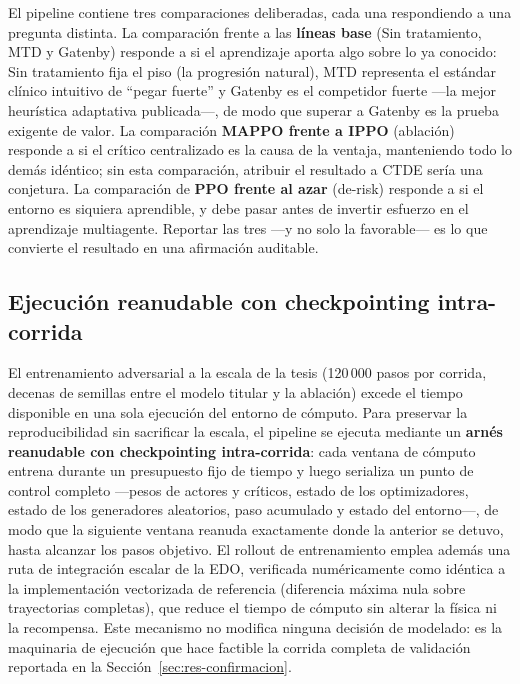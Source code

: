 El pipeline contiene tres comparaciones deliberadas, cada una respondiendo a una pregunta distinta. La comparación frente a las \textbf{líneas base} (Sin tratamiento, MTD y Gatenby) responde a si el aprendizaje aporta algo sobre lo ya conocido: Sin tratamiento fija el piso (la progresión natural), MTD representa el estándar clínico intuitivo de ``pegar fuerte'' y Gatenby es el competidor fuerte ---la mejor heurística adaptativa publicada---, de modo que superar a Gatenby es la prueba exigente de valor. La comparación \textbf{MAPPO frente a IPPO} (ablación) responde a si el crítico centralizado es la causa de la ventaja, manteniendo todo lo demás idéntico; sin esta comparación, atribuir el resultado a CTDE sería una conjetura. La comparación de \textbf{PPO frente al azar} (de-risk) responde a si el entorno es siquiera aprendible, y debe pasar antes de invertir esfuerzo en el aprendizaje multiagente. Reportar las tres ---y no solo la favorable--- es lo que convierte el resultado en una afirmación auditable.

\subsection{Ejecución reanudable con checkpointing intra-corrida}
\label{sec:checkpointing}

El entrenamiento adversarial a la escala de la tesis (120\,000 pasos por corrida, decenas de semillas entre el modelo titular y la ablación) excede el tiempo disponible en una sola ejecución del entorno de cómputo. Para preservar la reproducibilidad sin sacrificar la escala, el pipeline se ejecuta mediante un \textbf{arnés reanudable con checkpointing intra-corrida}: cada ventana de cómputo entrena durante un presupuesto fijo de tiempo y luego serializa un punto de control completo ---pesos de actores y críticos, estado de los optimizadores, estado de los generadores aleatorios, paso acumulado y estado del entorno---, de modo que la siguiente ventana reanuda exactamente donde la anterior se detuvo, hasta alcanzar los pasos objetivo. El rollout de entrenamiento emplea además una ruta de integración escalar de la EDO, verificada numéricamente como idéntica a la implementación vectorizada de referencia (diferencia máxima nula sobre trayectorias completas), que reduce el tiempo de cómputo sin alterar la física ni la recompensa. Este mecanismo no modifica ninguna decisión de modelado: es la maquinaria de ejecución que hace factible la corrida completa de validación reportada en la Sección~\ref{sec:res-confirmacion}.
